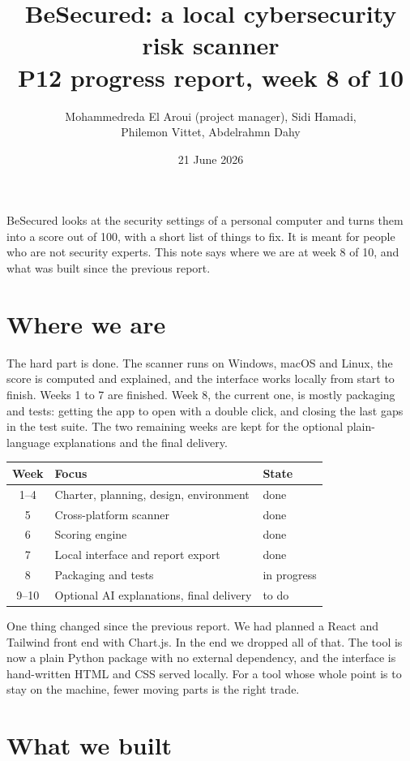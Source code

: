 \documentclass[11pt,a4paper]{article}
\title{\vspace{-8mm}BeSecured: a local cybersecurity risk scanner\\[3pt]
  \large P12 progress report, week 8 of 10}
\author{Mohammedreda El Aroui (project manager), Sidi Hamadi,\\
  Philemon Vittet, Abdelrahmn Dahy}
\date{21 June 2026}
\begin{document}
\maketitle

BeSecured looks at the security settings of a personal computer and turns them into a
score out of 100, with a short list of things to fix. It is meant for people who are
not security experts. This note says where we are at week 8 of 10, and what was built
since the previous report.

\section{Where we are}

The hard part is done. The scanner runs on Windows, macOS and Linux, the score is
computed and explained, and the interface works locally from start to finish. Weeks 1
to 7 are finished. Week 8, the current one, is mostly packaging and tests: getting the
app to open with a double click, and closing the last gaps in the test suite. The two
remaining weeks are kept for the optional plain-language explanations and the final
delivery.

\begin{table}[h]
\centering\small
\begin{tabular}{@{}cll@{}}
\toprule
Week & Focus & State \\
\midrule
1--4 & Charter, planning, design, environment & done \\
5 & Cross-platform scanner & done \\
6 & Scoring engine & done \\
7 & Local interface and report export & done \\
8 & Packaging and tests & in progress \\
9--10 & Optional AI explanations, final delivery & to do \\
\bottomrule
\end{tabular}
\end{table}

One thing changed since the previous report. We had planned a React and Tailwind front
end with Chart.js. In the end we dropped all of that. The tool is now a plain Python
package with no external dependency, and the interface is hand-written HTML and CSS
served locally. For a tool whose whole point is to stay on the machine, fewer moving
parts is the right trade.

\section{What we built}
\end{document}
